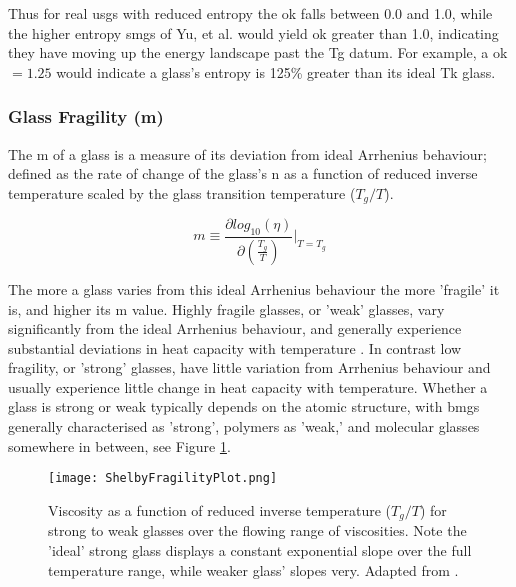 \documentclass[a4paper,12pt,oneside]{report}%
\begin{document}
Thus for real \glspl{usg} with reduced entropy  the \gls{ok} falls between 0.0 and 1.0, while the higher entropy \glspl{smg} of Yu, et al. \cite{Yu2013} would yield \gls{ok} greater than 1.0, indicating they have moving up the energy landscape past the \gls{Tg} datum. For example, a \gls{ok} $=1.25$ would indicate a glass's entropy is 125\% greater than its ideal \gls{Tk} glass.

\subsubsection{Glass Fragility (m)}
The \gls{m}  of a glass is a measure of its deviation from ideal Arrhenius behaviour; defined as the rate of change of the glass's \acrfull{n} as a function of reduced inverse temperature scaled by the glass transition temperature ($T_{g}/T$).

\begin{equation}
m \equiv 
\frac{\partial log_{10} (\eta)}
{\partial (\frac{T_{g}} {T})}
\biggr|_{T=T_{g}}
\label{equ:Fragility}
\end{equation}

The more a glass varies from this ideal Arrhenius behaviour the more 'fragile' it is, and higher its \gls{m} value. Highly fragile glasses, or 'weak' glasses, vary significantly from the ideal Arrhenius behaviour, and generally experience substantial deviations in heat capacity with temperature \cite{Shelby2005, Angell1995}. In contrast low fragility, or 'strong' glasses, have little variation from Arrhenius behaviour and usually experience little change in heat capacity with temperature. Whether a glass is strong or weak typically depends on the atomic structure, with \glspl{bmg} generally characterised as 'strong', polymers as 'weak,' and molecular glasses somewhere in between, see Figure \ref{fig:ShelbyFragPlot}. 

\begin{figure}[htb]
	\centering
	\texttt{[image: ShelbyFragilityPlot.png]}
	\caption[Viscosity as a function of reduced inverse temperature ($T_{g}/T$) for strong to weak glasses over the flowing range of viscosities. Note the 'ideal' strong glass displays a constant exponential slope over the full temperature range, while weaker glass' slopes very.]{Viscosity as a function of reduced inverse temperature ($T_{g}/T$) for strong to weak glasses over the flowing range of viscosities. Note the 'ideal' strong glass displays a constant exponential slope over the full temperature range, while weaker glass' slopes very. Adapted from \cite{Shelby2005}.}
	\label{fig:ShelbyFragPlot}
\end{figure}
\end{document}
